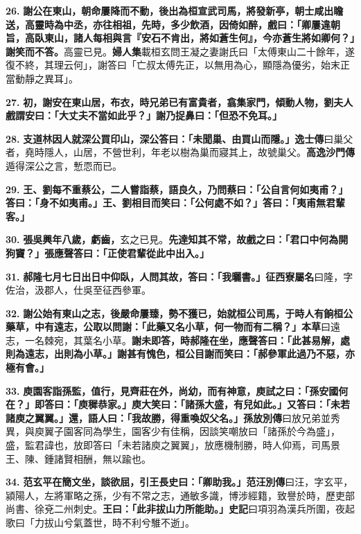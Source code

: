 \textbf{26.} \textbf{謝公在東山，朝命屢降而不動，後出為桓宣武司馬，將發新亭，朝士咸出瞻送，高靈時為中丞，亦往相祖，先時，多少飲酒，因倚如醉，戲曰：「卿屢違朝旨，高臥東山，諸人每相與言『安石不肯出，將如蒼生何』，今亦蒼生將如卿何？」謝笑而不答。}{\footnotesize 高靈已見。\textbf{婦人集}載桓玄問王凝之妻謝氏曰「太傅東山二十餘年，遂復不終，其理云何」，謝答曰「亡叔太傅先正，以無用為心，顯隱為優劣，始末正當動靜之異耳」。}

\textbf{27.} \textbf{初，謝安在東山居，布衣，時兄弟已有富貴者，翕集家門，傾動人物，劉夫人戲謂安曰：「大丈夫不當如此乎？」謝乃捉鼻曰：「但恐不免耳。」}

\textbf{28.} \textbf{支道林因人就深公買印山，深公答曰：「未聞巢、由買山而隱。」}{\footnotesize \textbf{逸士傳}曰巢父者，堯時隱人，山居，不營世利，年老以樹為巢而寢其上，故號巢父。\textbf{高逸沙門傳}遁得深公之言，慙恧而已。}

\textbf{29.} \textbf{王、劉每不重蔡公，二人嘗詣蔡，語良久，乃問蔡曰：「公自言何如夷甫？」答曰：「身不如夷甫。」王、劉相目而笑曰：「公何處不如？」答曰：「夷甫無君輩客。」}

\textbf{30.} \textbf{張吳興年八歲，虧齒，}{\footnotesize 玄之已見。}\textbf{先達知其不常，故戲之曰：「君口中何為開狗竇？」張應聲答曰：「正使君輩從此中出入。」}

\textbf{31.} \textbf{郝隆七月七日出日中仰臥，人問其故，答曰：「我曬書。」}{\footnotesize \textbf{征西寮屬名}曰隆，字佐治，汲郡人，仕吳至征西參軍。}

\textbf{32.} \textbf{謝公始有東山之志，後嚴命屢臻，勢不獲已，始就桓公司馬，于時人有餉桓公藥草，中有遠志，公取以問謝：「此藥又名小草，何一物而有二稱？」}{\footnotesize \textbf{本草}曰遠志，一名棘宛，其葉名小草。}\textbf{謝未即答，時郝隆在坐，應聲答曰：「此甚易解，處則為遠志，出則為小草。」謝甚有愧色，桓公目謝而笑曰：「郝參軍此過乃不惡，亦極有會。」}

\textbf{33.} \textbf{庾園客詣孫監，值行，見齊莊在外，尚幼，而有神意，庾試之曰：「孫安國何在？」即答曰：「庾穉恭家。」庾大笑曰：「諸孫大盛，有兒如此。」又答曰：「未若諸庾之翼翼。」還，語人曰：「我故勝，得重喚奴父名。」}{\footnotesize \textbf{孫放別傳}曰放兄弟並秀異，與庾翼子園客同為學生，園客少有佳稱，因談笑嘲放曰「諸孫於今為盛」，盛，監君諱也，放即答曰「未若諸庾之翼翼」，放應機制勝，時人仰焉，司馬景王、陳、鍾諸賢相酬，無以踰也。}

\textbf{34.} \textbf{范玄平在簡文坐，談欲屈，引王長史曰：「卿助我。」}{\footnotesize \textbf{范汪別傳}曰汪，字玄平，潁陽人，左將軍略之孫，少有不常之志，通敏多識，博涉經籍，致譽於時，歷吏部尚書、徐兗二州刺史。}\textbf{王曰：「此非拔山力所能助。」}{\footnotesize \textbf{史記}曰項羽為漢兵所圍，夜起歌曰「力拔山兮氣蓋世，時不利兮騅不逝」。}


